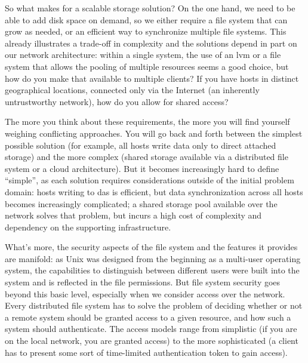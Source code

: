 So what makes for a scalable storage solution?  On the
one hand, we need to be able to add disk space on
demand, so we either require a file system that can
grow as needed, or an efficient way to synchronize
multiple file systems.  This already illustrates a
trade-off in complexity and the solutions depend in
part on our network architecture:  within a single
system, the use of an \gls{lvm} or a file system that
allows the pooling of multiple resources seems a good
choice, but how do you make that available to multiple
clients?  If you have hosts in distinct geographical
locations, connected only via the Internet (an
inherently untrustworthy network), how do you allow
for shared access?

The more you think about these requirements, the more
you will find yourself weighing conflicting
approaches.  You will go back and forth between the
simplest possible solution (for example, all hosts
write data only to direct attached storage) and the
more complex (shared storage available via a
distributed file system or a cloud architecture).  But
it becomes increasingly hard to define ``simple'', as
each solution requires considerations outside of the
initial problem domain: hosts writing to \gls{das} is
efficient, but data synchronization across all hosts
becomes increasingly complicated; a shared storage
pool available over the network solves that problem,
but incurs a high cost of complexity and dependency on
the supporting infrastructure.

What's more, the security aspects of the file system
and the features it provides are manifold:  as Unix
was designed from the beginning as a multi-user
operating system, the capabilities to distinguish
between different users were built into the system and
is reflected in the file permissions.  But file system
security goes beyond this basic level, especially when
we consider access over the network.  Every
distributed file system has to solve the problem of
deciding whether or not a remote system should be
granted access to a given resource, and how such a
system should authenticate.  The access models range
from simplistic (if you are on the local network, you
are granted access) to the more sophisticated (a
client has to present some sort of time-limited
authentication token to gain access).

